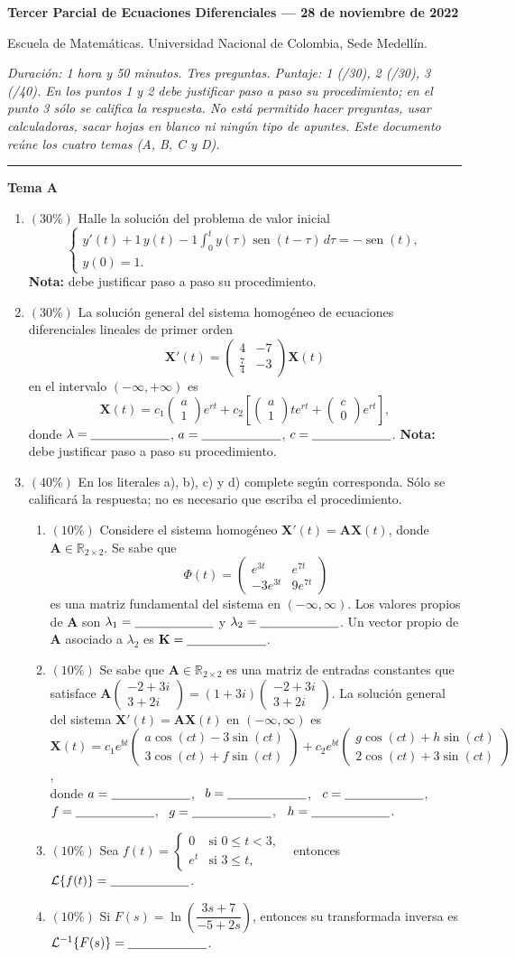 \documentclass[11pt]{article}
\newcommand{\rp}{\underline{\hspace{2.2cm}}}
\newcommand{\temacuerpo}[8]{%
\begin{enumerate}
\item $(30\%)$ Halle la solución del problema de valor inicial
\[
\begin{cases}
y'(t) + #1\, y(t) - #1 \displaystyle\int_0^t y(\tau)\operatorname{sen}(t - \tau)\,d\tau = #2\operatorname{sen}(t), \\[4pt]
y(0) = #3.
\end{cases}
\]
\textbf{Nota:} debe justificar paso a paso su procedimiento.

\item $(30\%)$ La solución general del sistema homogéneo de ecuaciones diferenciales lineales de primer orden
\[
\mathbf{X}'(t) = #4 \mathbf{X}(t)
\]
en el intervalo $(-\infty, +\infty)$ es
\[
\mathbf{X}(t) = c_1 \begin{pmatrix} a \\ 1 \end{pmatrix} e^{rt}
+ c_2 \left[ \begin{pmatrix} a \\ 1 \end{pmatrix} t e^{rt} + \begin{pmatrix} c \\ 0 \end{pmatrix} e^{rt} \right],
\]
donde $\lambda = \rp$, \quad $a = \rp$, \quad $c = \rp$.
\textbf{Nota:} debe justificar paso a paso su procedimiento.

\item $(40\%)$ En los literales a), b), c) y d) complete según corresponda. Sólo se calificará la respuesta; no es necesario que escriba el procedimiento.
\begin{enumerate}[label=(\alph*)]
\item $(10\%)$ Considere el sistema homogéneo $\mathbf{X}'(t) = \mathbf{A}\mathbf{X}(t)$, donde $\mathbf{A} \in \mathbb{R}_{2\times 2}$. Se sabe que
\[
\Phi(t) = #5
\]
es una matriz fundamental del sistema en $(-\infty, \infty)$. Los valores propios de $\mathbf{A}$ son $\lambda_1 = \rp$ y $\lambda_2 = \rp$. Un vector propio de $\mathbf{A}$ asociado a $\lambda_2$ es $\mathbf{K} = \rp$.
\item $(10\%)$ #6 \\
donde $a = \rp$, \ $b = \rp$, \ $c = \rp$, \ $f = \rp$, \ $g = \rp$, \ $h = \rp$.
\item $(10\%)$ Sea $f(t) = \begin{cases} 0 & \text{si } 0 \leq t < #7, \\ e^t & \text{si } #7 \leq t, \end{cases}$ \ entonces $\mathcal{L}\{f(t)\} = \rp$.
\item $(10\%)$ Si $F(s) = \ln\!\left(#8\right)$, entonces su transformada inversa es $\mathcal{L}^{-1}\{F(s)\} = \rp$.
\end{enumerate}
\end{enumerate}
}
\begin{document}
{\large\bfseries Tercer Parcial de Ecuaciones Diferenciales --- 28 de noviembre de 2022}

\medskip
\noindent Escuela de Matemáticas. Universidad Nacional de Colombia, Sede Medellín.

\medskip
\noindent\textit{Duración: 1 hora y 50 minutos. Tres preguntas. Puntaje: 1 (/30), 2 (/30), 3 (/40). En los puntos 1 y 2 debe justificar paso a paso su procedimiento; en el punto 3 sólo se califica la respuesta. No está permitido hacer preguntas, usar calculadoras, sacar hojas en blanco ni ningún tipo de apuntes. Este documento reúne los cuatro temas (A, B, C y D).}

\bigskip\hrule\medskip
\begin{center}\bfseries\large Tema A\end{center}
\temacuerpo{1}{-}{1}%
{\begin{pmatrix} 4 & -7 \\[2pt] \tfrac{7}{4} & -3 \end{pmatrix}}%
{\begin{pmatrix} e^{3t} & e^{7t} \\[2pt] -3e^{3t} & 9e^{7t} \end{pmatrix}}%
{Se sabe que $\mathbf{A} \in \mathbb{R}_{2\times 2}$ es una matriz de entradas constantes que satisface
$\mathbf{A}\begin{pmatrix} -2+3i \\ 3+2i \end{pmatrix} = (1+3i)\begin{pmatrix} -2+3i \\ 3+2i \end{pmatrix}$.
La solución general del sistema $\mathbf{X}'(t) = \mathbf{A}\mathbf{X}(t)$ en $(-\infty, \infty)$ es
$\mathbf{X}(t) = c_1 e^{bt}\begin{pmatrix} a\cos(ct) - 3\sin(ct) \\ 3\cos(ct) + f\sin(ct) \end{pmatrix}
+ c_2 e^{bt}\begin{pmatrix} g\cos(ct) + h\sin(ct) \\ 2\cos(ct) + 3\sin(ct) \end{pmatrix}$,}%
{3}{\dfrac{3s+7}{-5+2s}}
\end{document}
